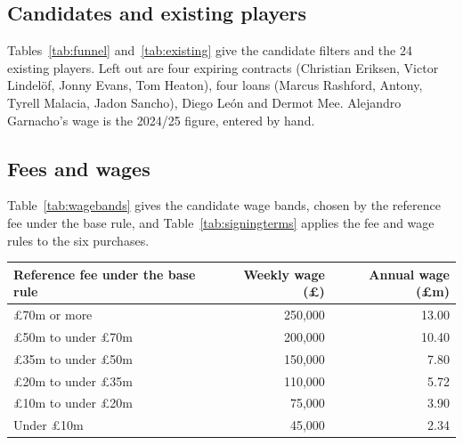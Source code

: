 \subsection{Candidates and existing players}

Tables~\ref{tab:funnel} and~\ref{tab:existing} give the candidate filters and the 24 existing players. Left out are four expiring contracts (Christian Eriksen, Victor Lindelöf, Jonny Evans, Tom Heaton), four loans (Marcus Rashford, Antony, Tyrell Malacia, Jadon Sancho), Diego León and Dermot Mee. Alejandro Garnacho's wage is the 2024/25 figure, entered by hand.

\begin{apptable}
\label{tab:funnel}
\end{apptable}

{}

\subsection{Fees and wages}

Table~\ref{tab:wagebands} gives the candidate wage bands, chosen by the reference fee under the base rule, and Table~\ref{tab:signingterms} applies the fee and wage rules to the six purchases.

\begin{apptable}
\label{tab:wagebands}
\begin{tabular}{@{}l r r@{}}
\toprule
Reference fee under the base rule & Weekly wage (\pounds) & Annual wage (\pounds m) \\
\midrule
\pounds 70m or more & 250,000 & 13.00 \\
\pounds 50m to under \pounds 70m & 200,000 & 10.40 \\
\pounds 35m to under \pounds 50m & 150,000 & 7.80 \\
\pounds 20m to under \pounds 35m & 110,000 & 5.72 \\
\pounds 10m to under \pounds 20m & 75,000 & 3.90 \\
Under \pounds 10m & 45,000 & 2.34 \\
\bottomrule
\end{tabular}
\end{apptable}

\begin{apptable}
\label{tab:signingterms}
\end{apptable}

